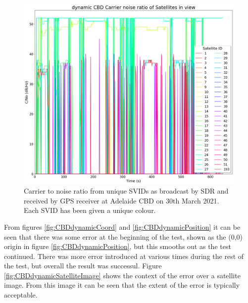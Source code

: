 \begin{figure}[H]
    \begin{centering}
        \includegraphics[width=12cm,keepaspectratio]{Figures/21_3_30_dynamic_CBD_results Carrier noise ratio.png}
        \caption{Carrier to noise ratio from unique SVIDs as broadcast by SDR and received by GPS receiver at Adelaide CBD on 30th March 2021. Each SVID has been given a unique colour.}
        \label{fig:CBDdynamicCNo}
    \end{centering}
\end{figure}

From figures \ref{fig:CBDdynamicCoord} and \ref{fig:CBDdynamicPosition} it can be seen that there was some error at the beginning of the test, shown as the (0,0) origin
in figure \ref{fig:CBDdynamicPosition}, but this smooths out as the test continued. There was more error introduced at various times during the rest of the test, but
overall the result was successul. Figure \ref{fig:CBDdynamicSatelliteImage} shows the context of the error over a satellite image. From this image it can be seen that the
extent of the error is typically acceptable.

